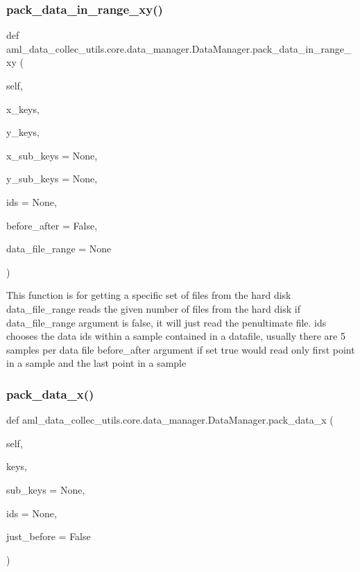 \subsubsection{\texorpdfstring{pack\+\_\+data\+\_\+in\+\_\+range\+\_\+xy()}{pack\_data\_in\_range\_xy()}}
{\footnotesize\ttfamily def aml\+\_\+data\+\_\+collec\+\_\+utils.\+core.\+data\+\_\+manager.\+Data\+Manager.\+pack\+\_\+data\+\_\+in\+\_\+range\+\_\+xy (\begin{DoxyParamCaption}\item[{}]{self,  }\item[{}]{x\+\_\+keys,  }\item[{}]{y\+\_\+keys,  }\item[{}]{x\+\_\+sub\+\_\+keys = {\ttfamily None},  }\item[{}]{y\+\_\+sub\+\_\+keys = {\ttfamily None},  }\item[{}]{ids = {\ttfamily None},  }\item[{}]{before\+\_\+after = {\ttfamily False},  }\item[{}]{data\+\_\+file\+\_\+range = {\ttfamily None} }\end{DoxyParamCaption})}

\begin{DoxyVerb}This function is for getting a specific set of files from the hard disk
data_file_range reads the given number of files from the hard disk
if data_file_range argument is false, it will just read the penultimate file.
ids chooses the data ids within a sample contained in a datafile, usually there are 5 samples per data file
before_after argument if set true would read only first point in a sample and the last point in a sample
\end{DoxyVerb}
 \hypertarget{classaml__data__collec__utils_1_1core_1_1data__manager_1_1_data_manager_a51ac4a22f0965b1a7e72823bc138a70b}{}\label{classaml__data__collec__utils_1_1core_1_1data__manager_1_1_data_manager_a51ac4a22f0965b1a7e72823bc138a70b} 
\subsubsection{\texorpdfstring{pack\+\_\+data\+\_\+x()}{pack\_data\_x()}}
{\footnotesize\ttfamily def aml\+\_\+data\+\_\+collec\+\_\+utils.\+core.\+data\+\_\+manager.\+Data\+Manager.\+pack\+\_\+data\+\_\+x (\begin{DoxyParamCaption}\item[{}]{self,  }\item[{}]{keys,  }\item[{}]{sub\+\_\+keys = {\ttfamily None},  }\item[{}]{ids = {\ttfamily None},  }\item[{}]{just\+\_\+before = {\ttfamily False} }\end{DoxyParamCaption})}

